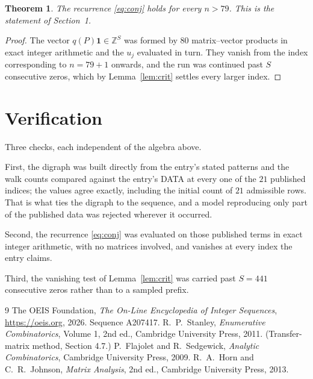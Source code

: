 \documentclass[11pt,a4paper]{article}
\theoremstyle{plain}
\newtheorem{theorem}{Theorem}
\theoremstyle{definition}
\begin{document}
\begin{theorem}
The recurrence \eqref{eq:conj} holds for every $n>79$. This is the statement of
Section~1.
\end{theorem}

\begin{proof}
The vector $q(P)\mathbf{1}\in\mathbb{Z}^{S}$ was formed by $80$ matrix--vector
products in exact integer arithmetic and the $u_j$ evaluated in turn. They vanish from the
index corresponding to $n=79+1$ onwards, and the run was continued past $S$ consecutive
zeros, which by Lemma~\ref{lem:crit} settles every larger index.
\end{proof}

\section{Verification}

Three checks, each independent of the algebra above.

First, the digraph was built directly from the entry's stated patterns and the walk counts
compared against the entry's DATA at every one of the $21$ published indices; the
values agree exactly, including the initial count of $21$ admissible rows. That is
what ties the digraph to the sequence, and a model reproducing only part of the published
data was rejected wherever it occurred.

Second, the recurrence \eqref{eq:conj} was evaluated on those published terms in exact
integer arithmetic, with no matrices involved, and vanishes at every index the entry claims.

Third, the vanishing test of Lemma~\ref{lem:crit} was carried past $S=441$ consecutive
zeros rather than to a sampled prefix.

\begin{thebibliography}{9}
 The OEIS Foundation, \emph{The On-Line Encyclopedia of Integer
Sequences}, \url{https://oeis.org}, 2026. Sequence A207417.
 R.~P.~Stanley, \emph{Enumerative Combinatorics}, Volume 1, 2nd ed.,
Cambridge University Press, 2011. (Transfer-matrix method, Section 4.7.)
 P.~Flajolet and R.~Sedgewick, \emph{Analytic Combinatorics}, Cambridge
University Press, 2009.
 R.~A.~Horn and C.~R.~Johnson, \emph{Matrix Analysis}, 2nd ed., Cambridge
University Press, 2013.
\end{thebibliography}
\end{document}
